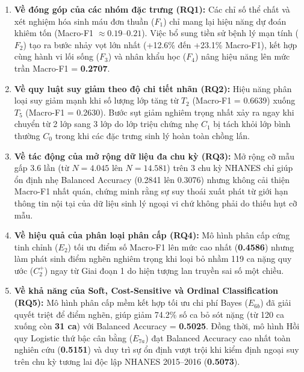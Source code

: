 \begin{enumerate}
    \item \textbf{Về đóng góp của các nhóm đặc trưng (RQ1):} Các chỉ số thể chất và xét nghiệm hóa sinh máu đơn thuần ($F_1$) chỉ mang lại hiệu năng dự đoán khiêm tốn (Macro-F1 $\approx 0.19$--$0.21$). Việc bổ sung tiền sử bệnh lý mạn tính ($F_2$) tạo ra bước nhảy vọt lớn nhất (+12.6\% đến +23.1\% Macro-F1), kết hợp cùng hành vi lối sống ($F_3$) và nhân khẩu học ($F_4$) nâng hiệu năng lên mức trần Macro-F1 = \textbf{0.2707}.
    \item \textbf{Về quy luật suy giảm theo độ chi tiết nhãn (RQ2):} Hiệu năng phân loại suy giảm mạnh khi số lượng lớp tăng từ $T_2$ (Macro-F1 = 0.6639) xuống $T_5$ (Macro-F1 = 0.2630). Bước sụt giảm nghiêm trọng nhất xảy ra ngay khi chuyển từ 2 lớp sang 3 lớp do lớp triệu chứng nhẹ $C_1$ bị tách khỏi lớp bình thường $C_0$ trong khi các đặc trưng sinh lý hoàn toàn chồng lấn.
    \item \textbf{Về tác động của mở rộng dữ liệu đa chu kỳ (RQ3):} Mở rộng cỡ mẫu gấp 3.6 lần (từ $N = 4.045$ lên $N = 14.581$) trên 3 chu kỳ NHANES chỉ giúp ổn định nhẹ Balanced Accuracy (0.2841 lên 0.3076) nhưng không cải thiện Macro-F1 nhất quán, chứng minh rằng sự suy thoái xuất phát từ giới hạn thông tin nội tại của dữ liệu sinh lý ngoại vi chứ không phải do thiếu hụt cỡ mẫu.
    \item \textbf{Về hiệu quả của phân loại phân cấp (RQ4):} Mô hình phân cấp cứng tinh chỉnh ($E_2$) tối ưu điểm số Macro-F1 lên mức cao nhất (\textbf{0.4586}) nhưng làm phát sinh điểm nghẽn nghiêm trọng khi loại bỏ nhầm 119 ca nặng quy ước ($C_2^+$) ngay từ Giai đoạn 1 do hiện tượng lan truyền sai số một chiều.
    \item \textbf{Về khả năng của Soft, Cost-Sensitive và Ordinal Classification (RQ5):} Mô hình phân cấp mềm kết hợp tối ưu chi phí Bayes ($E_{6b}$) đã giải quyết triệt để điểm nghẽn, giúp giảm 74.2\% số ca bỏ sót nặng (từ 120 ca xuống còn \textbf{31 ca}) với Balanced Accuracy = \textbf{0.5025}. Đồng thời, mô hình Hồi quy Logistic thứ bậc cân bằng ($E_{7a}$) đạt Balanced Accuracy cao nhất toàn nghiên cứu (\textbf{0.5151}) và duy trì sự ổn định vượt trội khi kiểm định ngoại suy trên chu kỳ tương lai độc lập NHANES 2015--2016 (\textbf{0.5073}).
\end{enumerate}

